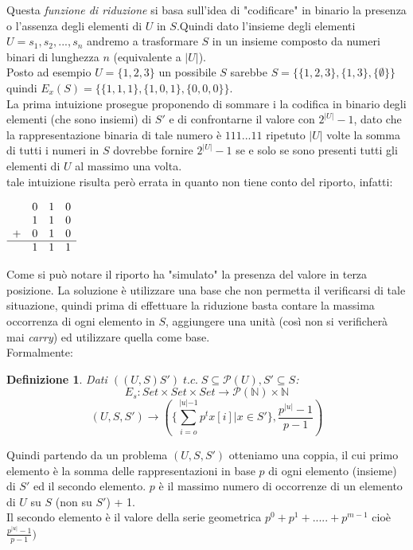 \documentclass[a4paper]{article}
\newtheorem*{definition}{Definizione}
\begin{document}
Questa \textit{funzione di riduzione} si basa sull'idea di "codificare" in binario la presenza o l'assenza degli elementi di $U$ in $S$.Quindi dato l'insieme degli elementi $U={s_1, s_2,...,s_n}$ andremo a trasformare $S$ in un insieme composto da numeri binari di lunghezza $n$ (equivalente a $|U|$).\\
Posto ad esempio $U = \{1,2,3\}$ un possibile $S$ sarebbe $S= \{\{1,2,3\},\{1,3\},\{\emptyset\}\}$ quindi $E_x(S) = \{\{1,1,1\},\{1,0,1\},\{0,0,0\}\}$.\\
La prima intuizione prosegue proponendo di sommare i la codifica in binario degli elementi (che sono insiemi) di $S'$ e di confrontarne il valore con $2^{|U|}-1$, dato che la rappresentazione binaria di tale numero è $111...11$ ripetuto $|U|$ volte la somma di tutti i numeri in $S$ dovrebbe fornire $2^{|U|}-1$ se e solo se sono presenti tutti gli elementi di $U$ al massimo una volta.\\
tale intuizione risulta però errata in quanto non tiene conto del riporto, infatti:
\begin{center}$\begin{array}{llll}
  & 0 & 1  & 0  \\ %
  & 1 & 1  & 0  \\	%
+ &  0 & 1  & 0  \\ %
\hline
  &  1 & 1  & 1  \\ %
\end{array}$
\end{center}
Come si può notare il riporto ha "simulato" la presenza del valore in terza posizione.
La soluzione è utilizzare una base che non permetta il verificarsi di tale situazione, quindi prima di effettuare la riduzione basta contare la massima occorrenza di ogni elemento in $S$, aggiungere una unità (così non si verificherà mai \textit{carry}) ed utilizzare quella come base.
\\Formalmente:
\begin{definition}
	Dati $((U,S)S') \; t.c. \; S \subseteq \mathcal{P}(U), S' \subseteq S$:
	$$ E_s: Set \times Set \times Set \rightarrow \mathcal{P}(\mathbb{N}) \times \mathbb{N}$$
	$$(U,S,S') \rightarrow (\{\sum_{i=o}^{\rvert u \lvert -1} p^tx[i] | x \in S'\}, \frac{p^{\rvert u \lvert} -1}{p -1})$$
\end{definition}
Quindi partendo da un problema $(U,S,S')$ otteniamo una coppia, il cui primo elemento è la somma delle rappresentazioni in base $p$ di ogni elemento (insieme) di $S'$ ed il secondo elemento.
$p$ è il massimo numero di occorrenze di un elemento di $U$ su $S$ (non su $S'$) + 1.\\
Il secondo elemento è il valore della serie geometrica $p^0 + p^1 +.....+ p^{m-1}$ cioè $\frac{p^{\rvert u \lvert} -1}{p -1})$
\end{document}
